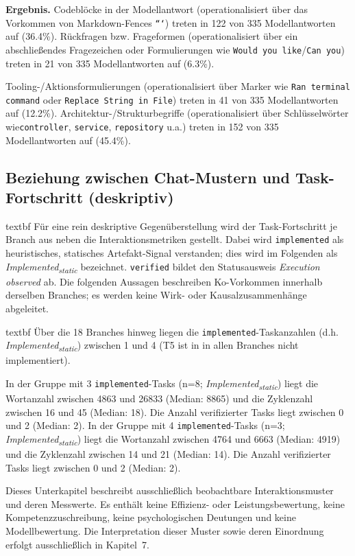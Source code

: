  \textbf{Ergebnis.} Codeblöcke in der Modellantwort (operationalisiert über das Vorkommen von Markdown-Fences \texttt{```}) treten in 122 von 335 Modellantworten auf (36.4\%).
Rückfragen bzw. Frageformen (operationalisiert über ein abschließendes Fragezeichen oder Formulierungen wie \texttt{Would you like}/\texttt{Can you}) treten in 21 von 335 Modellantworten auf (6.3\%).

Tooling-/Aktionsformulierungen (operationalisiert über Marker wie \texttt{Ran terminal command} oder \texttt{Replace String in File}) treten in 41 von 335 Modellantworten auf (12.2\%).
Architektur-/Strukturbegriffe (operationalisiert über Schlüsselwörter wie\linebreak[4]\texttt{controller}, \texttt{service}, \texttt{repository} u.a.) treten in 152 von 335 Modellantworten auf (45.4\%).

\subsection{Beziehung zwischen Chat-Mustern und Task-Fortschritt (deskriptiv)}
\label{sec:results_chat_vs_progress}

	\csname textbf Für eine rein deskriptive Gegenüberstellung wird der Task-Fortschritt je Branch aus  neben die Interaktionsmetriken gestellt. Dabei wird \texttt{implemented} als heuristisches, statisches Artefakt-Signal verstanden; dies wird im Folgenden als \textit{Implemented\textsubscript{static}} bezeichnet. \texttt{verified} bildet den Statusausweis \textit{Execution observed} ab. Die folgenden Aussagen beschreiben Ko-Vorkommen innerhalb derselben Branches; es werden keine Wirk- oder Kausalzusammenhänge abgeleitet.

	\csname textbf Über die 18 Branches hinweg liegen die \texttt{implemented}-Taskanzahlen (d.h. \textit{Implemented\textsubscript{static}}) zwischen 1 und 4 (T5 ist in  in allen Branches nicht implementiert).

In der Gruppe mit 3 \texttt{implemented}-Tasks (n=8; \textit{Implemented\textsubscript{static}}) liegt die Wortanzahl zwischen 4863 und 26833 (Median: 8865) und die Zyklenzahl zwischen 16 und 45 (Median: 18). Die Anzahl verifizierter Tasks liegt zwischen 0 und 2 (Median: 2).
In der Gruppe mit 4 \texttt{implemented}-Tasks (n=3; \textit{Implemented\textsubscript{static}}) liegt die Wortanzahl zwischen 4764 und 6663 (Median: 4919) und die Zyklenzahl zwischen 14 und 21 (Median: 14). Die Anzahl verifizierter Tasks liegt zwischen 0 und 2 (Median: 2).

Dieses Unterkapitel beschreibt ausschließlich beobachtbare Interaktionsmuster und deren Messwerte.
Es enthält keine Effizienz- oder Leistungsbewertung, keine Kompetenzzuschreibung, keine psychologischen Deutungen und keine Modellbewertung.
Die Interpretation dieser Muster sowie deren Einordnung erfolgt ausschließlich in Kapitel~7.
